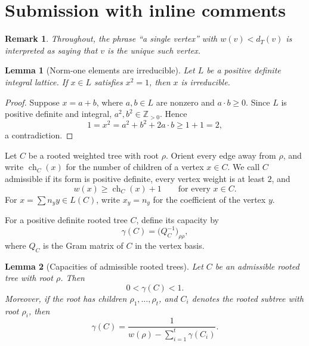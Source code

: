 \documentclass[12pt]{article}
\newtheorem{lemma}{Lemma}
\newtheorem{remark}{Remark}
\DeclareMathOperator{\ch}{ch}
\begin{document}
  \section{Submission with inline comments}

%
\date{}



\begin{remark}
Throughout, the phrase ``a single vertex'' with \(w(v)<d_T(v)\) is interpreted as saying that \(v\) is the unique such vertex.
\end{remark}

\begin{lemma}[Norm-one elements are irreducible]
Let \(L\) be a positive definite integral lattice. If \(x\in L\) satisfies \(x^2=1\), then \(x\) is irreducible.
\end{lemma}

\begin{proof}
Suppose \(x=a+b\), where \(a,b\in L\) are nonzero and \(a\cdot b\ge 0\). Since \(L\) is positive definite and integral, \(a^2,b^2\in \mathbb Z_{>0}\). Hence
\[
1=x^2=a^2+b^2+2a\cdot b\ge 1+1=2,
\]
a contradiction.
\end{proof}

Let \(C\) be a rooted weighted tree with root \(\rho\). Orient every edge away from \(\rho\), and write \(\ch_C(x)\) for the number of children of a vertex \(x\in C\). We call \(C\) admissible if its form is positive definite, every vertex weight is at least \(2\), and
\[
w(x)\ge \ch_C(x)+1
\qquad \text{for every } x\in C.
\]
For \(x=\sum n_y y\in L(C)\), write \(x_y=n_y\) for the coefficient of the vertex \(y\).

For a positive definite rooted tree \(C\), define its capacity by
\[
\gamma(C)=\bigl(Q_C^{-1}\bigr)_{\rho\rho},
\]
where \(Q_C\) is the Gram matrix of \(C\) in the vertex basis.

\begin{lemma}[Capacities of admissible rooted trees]
Let \(C\) be an admissible rooted tree with root \(\rho\). Then
\[
0<\gamma(C)<1.
\]
Moreover, if the root has children \(\rho_1,\dots,\rho_t\), and \(C_i\) denotes the rooted subtree with root \(\rho_i\), then
\[
\gamma(C)=\frac{1}{w(\rho)-\sum_{i=1}^t \gamma(C_i)}.
\]
\end{lemma}
\end{document}
